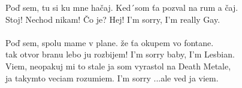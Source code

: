 \documentclass[a4paper, 10pt]{book}
\begin{document}
\begin{LARGE}
Poď sem, tu si ku mne hačaj.
Ked´som ťa pozval na rum a čaj.\\
Stoj! Nechod nikam! Čo je? Hej!
I'm sorry, I'm really Gay.\\

\textregistered\\

Poď sem, spolu mame v plane.
že ťa okupem vo fontane.\\
tak otvor branu lebo ju rozbijem!
I'm sorry baby, I'm Lesbian.\\

Viem, neopakuj mi to stale
ja som vyrastol na Death Metale,\\
ja takymto veciam rozumiem.
I'm sorry ...ale ved ja viem.\\

\textregistered \textregistered

\newpage


\begin{flushleft}

\end{flushleft}
\end{LARGE}
\end{document}
